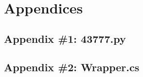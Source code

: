\chapter{Appendices}

\section{Appendix \#1: 43777.py} \label{appendix-1}


\newpage

\section{Appendix \#2: Wrapper.cs} \label{appendix-2}

